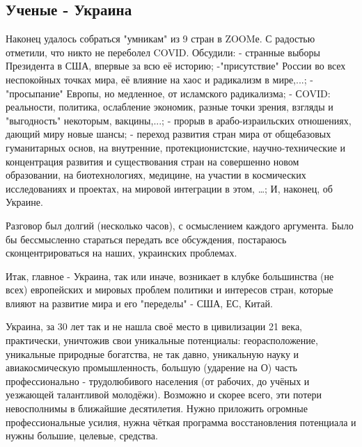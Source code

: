  
 
 

\subsection{Ученые - Украина}

Наконец удалось собраться "умникам" из 9 стран в ZOOMе. 
С радостью отметили, что никто не переболел COVID.
Обсудили:
- странные выборы Президента в США, впервые за всю её историю;
-"присутствие" России во всех неспокойных точках мира, её влияние на хаос и радикализм в мире,...;
- "просыпание" Европы, но медленное, от исламского радикализма;
- СOVID: реальности, политика, ослабление экономик, разные точки зрения, взгляды и "выгодность" некоторым, вакцины,...;
- прорыв в арабо-израильских отношениях, дающий миру новые шансы;
- переход развития стран мира от общебазовых гуманитарных основ, на внутренние, протекционистские, научно-технические и концентрация развития и  существования стран на совершенно новом образовании, на биотехнологиях, медицине, на участии в космических исследованиях и проектах, на мировой интеграции в этом, …;
И, наконец, об Украине.

Разговор был долгий (несколько часов), с осмыслением каждого аргумента. Было бы
бессмысленно стараться передать все обсуждения, постараюсь сконцентрироваться
на наших, украинских проблемах.

Итак, главное - Украина, так или иначе, возникает в клубке большинства (не
всех) европейских и мировых проблем политики и интересов стран, которые влияют
на развитие мира и его "переделы" - США, ЕС, Китай.

Украина, за 30 лет так и не нашла своё место в цивилизации 21 века,
практически, уничтожив свои уникальные потенциалы: георасположение, уникальные
природные богатства, не так давно, уникальную науку и авиакосмическую
промышленность, большую (ударение на О) часть профессионально - трудолюбивого
населения (от рабочих, до учёных и уезжающей талантливой молодёжи).  Возможно и
скорее всего, эти потери невосполнимы в ближайшие десятилетия. Нужно приложить
огромные профессиональные усилия, нужна чёткая программа восстановления
потенциала и нужны большие, целевые, средства.

